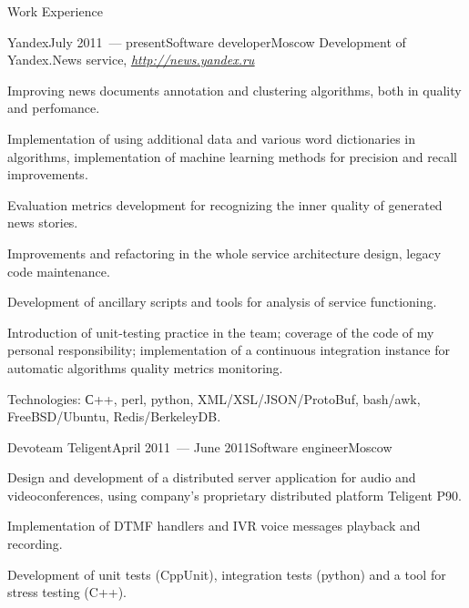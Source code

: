 \documentclass{resume} %
\newcommand{\hreftext}[1]{\underline{\textit{#1}}}
\begin{document}
\begin{rSection}{Work Experience}

\begin{rSubsection}{Yandex}{July 2011~--- present}{Software developer}{Moscow}
Development of Yandex.News service, \href{http://news.yandex.ru}{\hreftext{http://news.yandex.ru}}
\item Improving news documents annotation and clustering algorithms, both in quality and perfomance.

\item Implementation of using additional data and various word dictionaries in algorithms, implementation of machine learning methods for precision and recall improvements.

\item Evaluation metrics development for recognizing the inner quality of generated news stories.

\item Improvements and refactoring in the whole service architecture design, legacy code maintenance.

\item Development of ancillary scripts and tools for analysis of service functioning.

\item Introduction of unit-testing practice in the team; coverage of the code of my personal responsibility; implementation of a continuous integration instance for automatic algorithms quality metrics monitoring.

\item Technologies: С++, perl, python, XML/XSL/JSON/ProtoBuf, bash/awk, FreeBSD/Ubuntu, 
Redis/BerkeleyDB.
\end{rSubsection}


\begin{rSubsection}{Devoteam Teligent}{April 2011~--- June 2011}{Software engineer}{Moscow}

\item Design and development of a distributed server application for audio and videoconferences, 
using company's proprietary distributed platform Teligent P90. 

\item Implementation of DTMF handlers and IVR voice messages playback and recording.

\item Development of unit tests (CppUnit), integration tests (python) and a tool for stress testing (C++).


\end{rSubsection}
\end{rSection}
\end{document}
